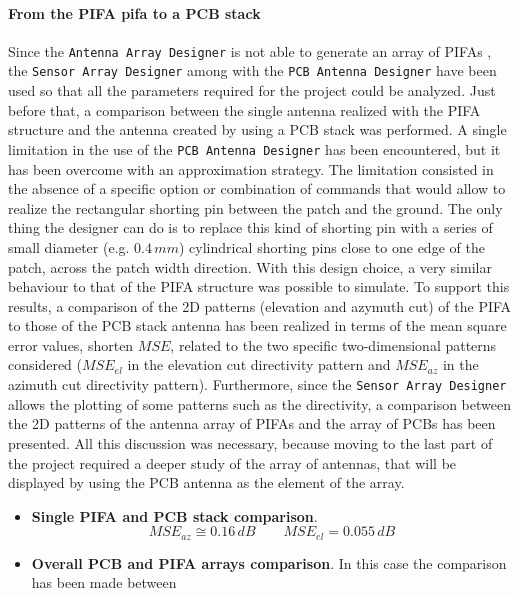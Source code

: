 \documentclass[12pt,a4paper]{article}
\begin{document}
{	\paragraph{\selectfont\color{Turquoise}From the PIFA pifa to a PCB stack}
Since the \texttt{\color{Mahogany}Antenna Array Designer} is not able to generate an array of PIFAs , the \texttt{\color{Mahogany}Sensor Array Designer} among with the \texttt{\color{Mahogany}PCB Antenna Designer} have been used so that all the parameters required for the project could be analyzed. Just before that, a comparison between the single antenna realized with the PIFA structure and the antenna created by using a PCB stack was performed. A single limitation in the use of the \texttt{\color{Mahogany}PCB Antenna Designer} has been encountered, but it has been overcome with an approximation strategy. The limitation consisted in the absence of a specific option or combination of commands that would allow to realize the rectangular shorting pin between the patch and the ground. The only thing the designer can do is to replace this kind of shorting pin with a series of small diameter (e.g. $0.4\,mm$) cylindrical shorting pins close to one edge of the patch, across the patch width direction. With this design choice, a very similar behaviour to that of the PIFA structure was possible to simulate. To support this results, a comparison of the 2D patterns (elevation and azymuth cut) of the PIFA to those of the PCB stack antenna has been realized in terms of the mean square error values, shorten $MSE$, related to the two specific two-dimensional patterns considered ($MSE_{el}$ in the elevation cut directivity pattern and $MSE_{az}$ in the azimuth cut directivity pattern). Furthermore, since the \texttt{\color{Mahogany}Sensor Array Designer} allows the plotting of some patterns such as the directivity, a comparison between the 2D patterns of the antenna array of PIFAs and the array of PCBs has been presented. All this discussion was necessary, because moving to the last part of the project required a deeper study of the array of antennas, that will be displayed by using the PCB antenna as the element of the array. 
\begin{itemize}
	\item \textbf{Single PIFA and PCB stack comparison}.
	\begin{equation}
		MSE_{az}\cong 0.16\,dB\qquad MSE_{el}=0.055\,dB
	\end{equation}
	\item \textbf{Overall PCB and PIFA arrays comparison}. In this case the comparison has been made between

\end{itemize}}
\end{document}

